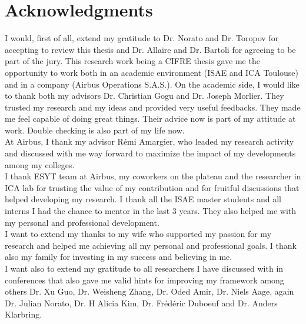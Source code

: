 \chapter*{Acknowledgments}
I would, first of all, extend my gratitude to Dr. Norato and Dr. Toropov for accepting to review this thesis and Dr. Allaire and Dr. Bartoli for agreeing to be part of the jury. 
 This research work being a CIFRE thesis gave me the opportunity to work both in an academic environment (ISAE and ICA Toulouse) and in a company (Airbus Operations S.A.S.). On the academic side, I would like to thank both my advisors Dr. Christian Gogu and Dr. Joseph Morlier. They trusted my research and my ideas and provided very useful feedbacks. They made me feel capable of doing great things. Their advice now is part of my attitude at work. Double checking is also part of my life now.\\
 At Airbus, I thank my advisor Rémi Amargier, who leaded my research activity and discussed with me way forward to maximize the impact of my developments among my colleges.\\
 
 I thank ESYT team at Airbus, my coworkers on the plateau and the researcher in ICA lab for trusting the value of my contribution and for fruitful discussions that helped developing my research. I thank all the ISAE master students and all interns I had the chance to mentor in the last 3 years. They also helped me with my personal and professional development.\\
 
 I want to extend my thanks to my wife who supported my passion for my research and helped me achieving all my personal and professional goals. I thank also my family for investing in my success and believing in me.\\
 
 I want also to extend my gratitude to all researchers I have discussed with in conferences that also gave me valid hints for improving my framework among others Dr. Xu Guo, Dr. Weisheng Zhang, Dr. Oded Amir, Dr. Niels Aage, again Dr. Julian Norato, Dr. H Alicia Kim, Dr. Frédéric Duboeuf and Dr. Anders Klarbring. 
 

